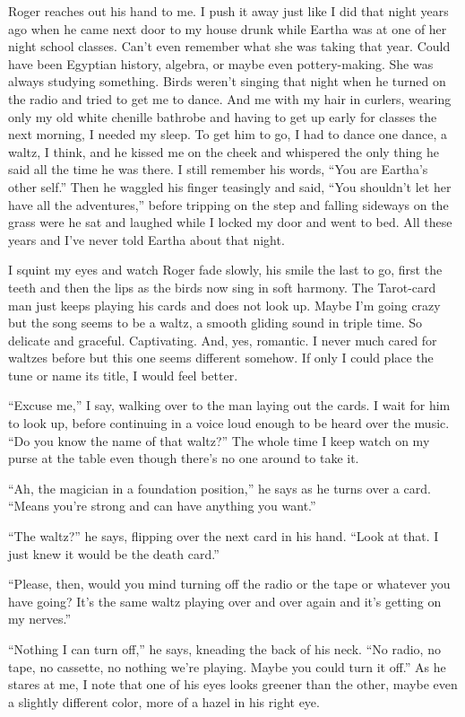 \documentclass[twoside,10pt]{book}
\begin{document}
Roger reaches out his hand to me. I push it away just like I did that
night years ago when he came next door to my house drunk while Eartha
was at one of her night school classes. Can't even remember what she was
taking that year. Could have been Egyptian history, algebra, or maybe
even pottery-making. She was always studying something. Birds weren't
singing that night when he turned on the radio and tried to get me to
dance. And me with my hair in curlers, wearing only my old white
chenille bathrobe and having to get up early for classes the next
morning, I needed my sleep. To get him to go, I had to dance one dance,
a waltz, I think, and he kissed me on the cheek and whispered the only
thing he said all the time he was there. I still remember his words,
``You are Eartha's other self.'' Then he waggled his finger teasingly
and said, ``You shouldn't let her have all the adventures,'' before
tripping on the step and falling sideways on the grass were he sat and
laughed while I locked my door and went to bed. All these years and I've
never told Eartha about that night.

I squint my eyes and watch Roger fade slowly, his smile the last to go,
first the teeth and then the lips as the birds now sing in soft harmony.
The Tarot-card man just keeps playing his cards and does not look up.
Maybe I'm going crazy but the song seems to be a waltz, a smooth gliding
sound in triple time. So delicate and graceful. Captivating. And, yes,
romantic. I never much cared for waltzes before but this one seems
different somehow. If only I could place the tune or name its title, I
would feel better.

``Excuse me,'' I say, walking over to the man laying out the cards. I
wait for him to look up, before continuing in a voice loud enough to be
heard over the music. ``Do you know the name of that waltz?'' The whole
time I keep watch on my purse at the table even though there's no one
around to take it.

``Ah, the magician in a foundation position,'' he says as he turns over
a card. ``Means you're strong and can have anything you want.''

``The waltz?'' he says, flipping over the next card in his hand. ``Look
at that. I just knew it would be the death card.''

``Please, then, would you mind turning off the radio or the tape or
whatever you have going? It's the same waltz playing over and over again
and it's getting on my nerves.''

``Nothing I can turn off,'' he says, kneading the back of his neck. ``No
radio, no tape, no cassette, no nothing we're playing. Maybe you could
turn it off.'' As he stares at me, I note that one of his eyes looks
greener than the other, maybe even a slightly different color, more of a
hazel in his right eye.
\end{document}
